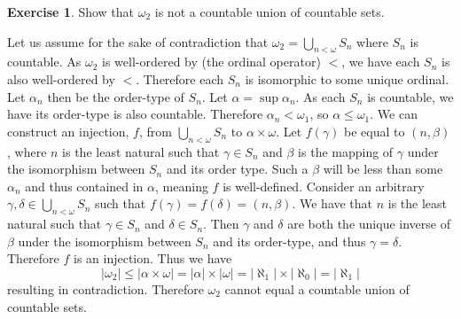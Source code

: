 \documentclass{article}
\theoremstyle{definition}
\newtheorem{exer}{Exercise}[section]
\newcommand{\abs}[1]{\lvert#1\rvert}
\newlength{\defparindent}
\newenvironment{answer}
    {\begin{mdframed}[backgroundcolor=gray!15, linewidth=0pt] \setlength{\parindent}{\defparindent}}
    {\end{mdframed}}
\begin{document}
\begin{exer}
    Show that $\omega_2$ is not a countable union of countable sets. 
    \begin{answer}
        Let us assume for the sake of contradiction that $\omega_2 = \bigcup_{n < \omega} S_n$ where $S_n$ is countable. As $\omega_2$ is well-ordered by (the ordinal operator) $<$, we have each $S_n$ is also well-ordered by $<$. Therefore each $S_n$ is isomorphic to some unique ordinal. Let $\alpha_n$ then be the order-type of $S_n$. Let $\alpha = \sup \alpha_n$. As each $S_n$ is countable, we have its order-type is also countable. Therefore $\alpha_n < \omega_1$, so $\alpha \le \omega_1$. We can construct an injection, $f$, from $\bigcup_{n < \omega} S_n$ to $\alpha \times \omega$. Let $f(\gamma)$ be equal to $(n, \beta)$, where $n$ is the least natural such that $\gamma \in S_n$ and $\beta$ is the mapping of $\gamma$ under the isomorphism between $S_n$ and its order type. Such a $\beta$ will be less than some $\alpha_n$ and thus contained in $\alpha$, meaning $f$ is well-defined. Consider an arbitrary $\gamma, \delta \in \bigcup_{n < \omega} S_n$ such that $f(\gamma) = f(\delta) = (n, \beta)$. We have that $n$ is the least natural such that $\gamma \in S_n$ and $\delta \in S_n$. Then $\gamma$ and $\delta$ are both the unique inverse of $\beta$ under the isomorphism between $S_n$ and its order-type, and thus $\gamma = \delta$. Therefore $f$ is an injection. Thus we have 
        \[
            \abs{\omega_2} \le \abs{\alpha \times \omega} = \abs{\alpha} \times \abs{\omega} = \abs{\aleph_1} \times \abs{\aleph_0} = \abs{\aleph_1}
        \]
        resulting in contradiction. Therefore $\omega_2$ cannot equal a countable union of countable sets.
    \end{answer}
\end{exer}
\end{document}

